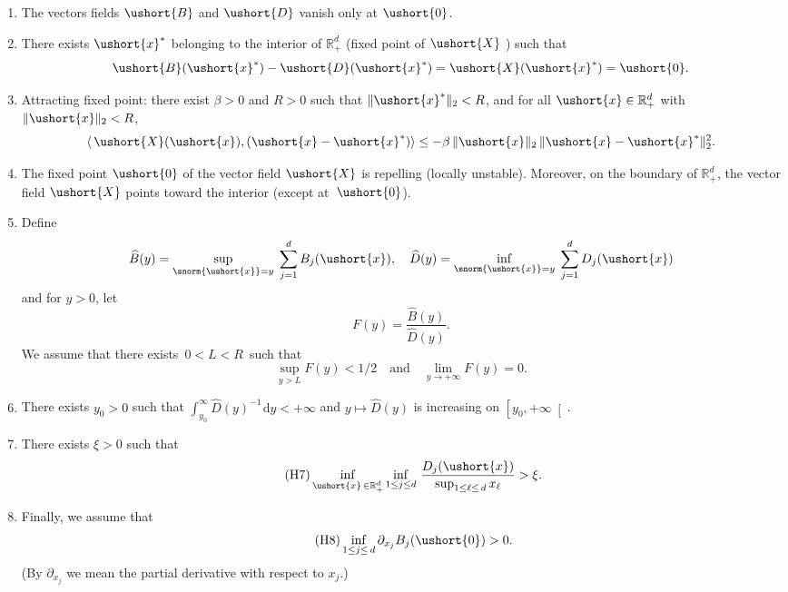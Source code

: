 \documentclass[JEP,XML,SOM,Unicode]{cedram}
\newcommand{\scaleto}[2]{#1}
\numberwithin{equation}{section}
\theoremstyle{plain}
\theoremstyle{definition}
\newcommand{\rpd}{\mathbb{R}_+^d}
\newcommand{\srpd}{\mathbb{R}_+^d}
\newcommand{\vecxf}{\ushort{x}^*}
\newcommand{\vecx}{\ushort{x}}
\newcommand{\vecX}{\ushort{X}}
\newcommand{\vecB}{\ushort{B}}
\newcommand{\vecD}{\ushort{D}}
\newcommand{\veczer}{\ushort{0}}
\newcommand{\dd}{\hspace{1pt}\mathrm{d}}
\newcommand{\normdeux}[1]{\|#1\|_{2}}\let\snormdeux\normdeux
\begin{document}
\bgroup{}
\begin{enumerate}
\item \label{H1} The vectors fields $\vecB$ and $\vecD$ vanish only at $\ushort{0}$.
\item \label{H2} There exists $\vecxf$ belonging to the interior of $\rpd$ \textup{(}fixed point of $\vecX$
\textup{)} such that
\[
\vecB(\vecxf)-\vecD(\vecxf)=\vecX(\vecxf)=\ushort{0}.
\]
\item\label{H3} Attracting fixed point: there exist $\beta>0$ and $R>0$ such that $\normdeux{\vecxf}<R$, and for all $\vecx\in \rpd$ with $\normdeux{\vecx}<R$,
\begin{equation}\label{Xalpha}
\langle\, \vecX(\vecx), (\vecx-\vecxf)\rangle \le -\beta\, \normdeux{\vecx}\, \|\vecx-\vecxf\|_{2}^2.
\end{equation}
\item\label{H4} The fixed point $\ushort{0}$ of the vector field $\vecX$ is repelling (locally unstable).
Moreover, on the boundary of $\rpd$, the vector field $\vecX$ points toward the interior (except at~$\veczer$).
\item\label{H5} Define
\[
\widehat{B}(y)=\sup_{\snorm{\vecx}=y}\;\sum_{j=1}^{d}B_{j}(\vecx),\quad \widehat{D}(y)=
\inf_{\snorm{\vecx}=y}\;\sum_{j=1}^{d}D_{j}(\vecx)
\]
and for $y>0$, let
\[
F(y)= \frac{\widehat{B}(y)}{\widehat{D}(y)}.
\]
We assume that there exists $\,0<L<R\,$ such that
\[
\sup_{y>L} F(y)<\scaleto{1/2}{10pt}\quad\text{and}\quad \lim_{y\to+\infty} F(y)=0.
\]

\item\label{H6} There exists $y_{0}>0$ such that $\int_{y_{0}}^{\infty} \widehat{D}(y)^{-1}\dd y<+\infty$ and $y\mapsto \widehat{D}(y)$ is
increasing on $\left[y_{0},+\infty\right[$.
\item
There exists $\xi>0$ such that
\begin{equation}
\label{cond:mort}
\tag{H7}
\inf_{\vecx\,\in \srpd} \inf_{1\leq j\leq d}\, \frac{D_{j}(\vecx)}{\sup_{1\leq \ell\leq \,d} x_{\ell}} >\xi.
\end{equation}
\item
Finally, we assume that
\begin{equation}\label{cond:nais}\tag{H8}
\inf_{1\leq j\leq \, d}\partial_{x_{j}} B_{j}(\veczer) > 0.
\end{equation}
(By $\partial_{x_{j}}$ we mean the partial derivative with respect to $x_{j}$.)
\end{enumerate}
\egroup
\end{document}
